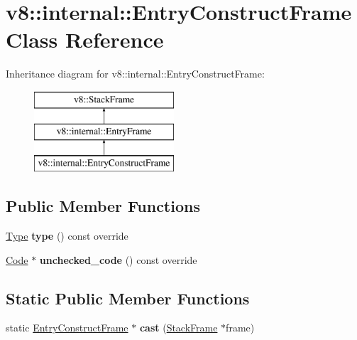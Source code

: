 \hypertarget{classv8_1_1internal_1_1_entry_construct_frame}{}\section{v8\+:\+:internal\+:\+:Entry\+Construct\+Frame Class Reference}
\label{classv8_1_1internal_1_1_entry_construct_frame}
Inheritance diagram for v8\+:\+:internal\+:\+:Entry\+Construct\+Frame\+:\begin{figure}[H]
\begin{center}
\leavevmode
\includegraphics[height=3.000000cm]{classv8_1_1internal_1_1_entry_construct_frame}
\end{center}
\end{figure}
\subsection*{Public Member Functions}
\begin{DoxyCompactItemize}
\item 
\hyperlink{classv8_1_1internal_1_1_type}{Type} {\bfseries type} () const  override\hypertarget{classv8_1_1internal_1_1_entry_construct_frame_ae94c432b1cc9aaba2354e263fc5ee6ad}{}\label{classv8_1_1internal_1_1_entry_construct_frame_ae94c432b1cc9aaba2354e263fc5ee6ad}

\item 
\hyperlink{classv8_1_1internal_1_1_code}{Code} $\ast$ {\bfseries unchecked\+\_\+code} () const  override\hypertarget{classv8_1_1internal_1_1_entry_construct_frame_a29e4a68773f50e5aac5da860a7d2f417}{}\label{classv8_1_1internal_1_1_entry_construct_frame_a29e4a68773f50e5aac5da860a7d2f417}

\end{DoxyCompactItemize}
\subsection*{Static Public Member Functions}
\begin{DoxyCompactItemize}
\item 
static \hyperlink{classv8_1_1internal_1_1_entry_construct_frame}{Entry\+Construct\+Frame} $\ast$ {\bfseries cast} (\hyperlink{classv8_1_1_stack_frame}{Stack\+Frame} $\ast$frame)\hypertarget{classv8_1_1internal_1_1_entry_construct_frame_af89d5ce7d4889800e2f5ce7ce015c457}{}\label{classv8_1_1internal_1_1_entry_construct_frame_af89d5ce7d4889800e2f5ce7ce015c457}

\end{DoxyCompactItemize}
